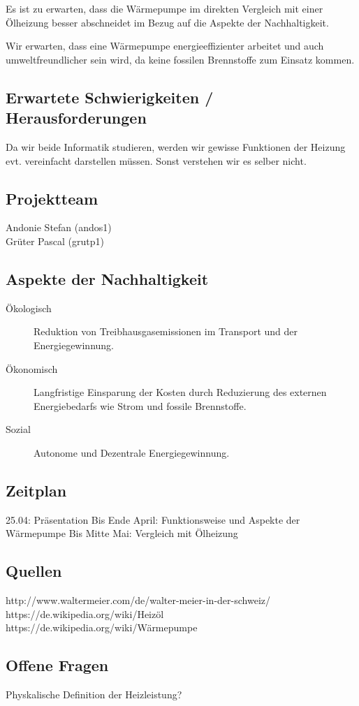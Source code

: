 \documentclass[09pt,paper=a4,final]{scrartcl}
\begin{document}
  Es ist zu erwarten, dass die Wärmepumpe im direkten Vergleich mit einer
  Ölheizung besser abschneidet im Bezug auf die Aspekte der Nachhaltigkeit.
  
  Wir erwarten, dass eine Wärmepumpe energieeffizienter arbeitet und auch
  umweltfreundlicher sein wird, da keine fossilen Brennstoffe zum Einsatz kommen.

\subsection*{Erwartete Schwierigkeiten / Herausforderungen}

Da wir beide Informatik studieren, werden wir gewisse Funktionen der Heizung evt. vereinfacht darstellen müssen. Sonst verstehen wir es selber nicht.

\subsection*{Projektteam}

  \begin{description}
    \item[Andonie Stefan (andos1)]
    \item[Grüter Pascal (grutp1)]
  \end{description}

\subsection*{Aspekte der Nachhaltigkeit}

  \begin{description}
    \item[Ökologisch] Reduktion von Treibhausgasemissionen im Transport und
    der Energiegewinnung.
    \item[Ökonomisch] Langfristige Einsparung der Kosten durch Reduzierung des
    externen Energiebedarfs wie Strom und fossile Brennstoffe.
    \item[Sozial] Autonome und Dezentrale Energiegewinnung.
  \end{description}

\subsection*{Zeitplan}

25.04: Präsentation
Bis Ende April: Funktionsweise und Aspekte der Wärmepumpe
Bis Mitte Mai: Vergleich mit Ölheizung

\subsection*{Quellen}

http://www.waltermeier.com/de/walter-meier-in-der-schweiz/ \\
https://de.wikipedia.org/wiki/Heizöl \\
https://de.wikipedia.org/wiki/Wärmepumpe \\

\subsection*{Offene Fragen}

Physkalische Definition der Heizleistung?
\end{document}
